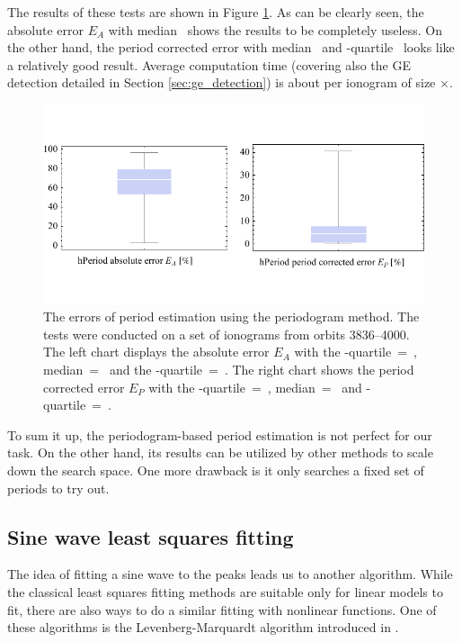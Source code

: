 The results of these tests are shown in Figure \ref{fig:periodogram_errors}. As can be clearly seen, the absolute error $E_A$ with median~ shows the results to be completely useless. On the other hand, the period corrected error with median~ and \mbox{-quartile}~ looks like a relatively good result. Average computation time (covering also the GE detection detailed in Section \ref{sec:ge_detection}) is about  per ionogram of size $\times$.  

\begin{figure}
	\centering
	\includegraphics[width=140mm]{images/periodogram_errors.pdf}
	\caption{The errors of period estimation using the periodogram method. The tests were conducted on a set of ionograms from orbits 3836--4000. The left chart displays the absolute error $E_A$ with the \mbox{-quartile}~=~, median~=~ and the \mbox{-quartile}~=~. The right chart shows the period corrected error $E_P$ with the \mbox{-quartile}~=~, median~=~ and \mbox{-quartile}~=~.}
	\label{fig:periodogram_errors}
\end{figure}

To sum it up, the periodogram-based period estimation is not perfect for our task. On the other hand, its results can be utilized by other methods to scale down the search space. One more drawback is it only searches a fixed set of periods to try out.

\subsection{Sine wave least squares fitting}
The idea of fitting a sine wave to the peaks leads us to another algorithm. While the classical least squares fitting methods are suitable only for linear models to fit, there are also ways to do a similar fitting with nonlinear functions. One of these algorithms is the Levenberg-Marquardt algorithm introduced in \citep{Marquardt1963}.
 
